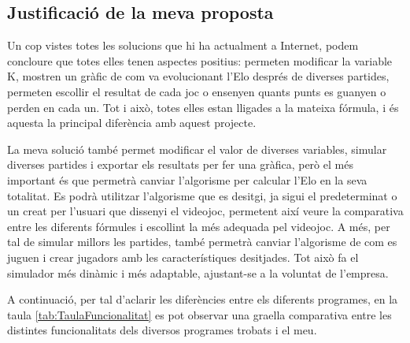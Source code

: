\documentclass[a4paper]{article}
\begin{document}
\subsection{Justificació de la meva proposta}
Un cop vistes totes les solucions que hi ha actualment a Internet, podem concloure que totes elles tenen aspectes positius: permeten modificar la variable K,  mostren un gràfic de com va evolucionant l'Elo després de diverses partides,  permeten escollir el resultat de cada joc o ensenyen quants punts es guanyen o perden en cada un. Tot i això, totes elles estan lligades a la mateixa fórmula, i és aquesta la principal diferència amb aquest projecte.

La meva solució també permet modificar el valor de diverses variables, simular diverses partides i exportar els resultats per fer una gràfica, però el més important és que permetrà canviar l'algorisme per calcular l'Elo en la seva totalitat. Es podrà utilitzar l'algorisme que es desitgi, ja sigui el predeterminat o un creat per l'usuari que dissenyi el videojoc, permetent així veure la comparativa entre les diferents fórmules i escollint la més adequada pel videojoc. A més, per tal de simular millors les partides, també permetrà canviar l'algorisme de com es juguen i crear jugadors amb les característiques desitjades. Tot això fa el simulador més dinàmic i més adaptable, ajustant-se a la voluntat de l'empresa.

A continuació, per tal d'aclarir les diferències entre els diferents programes, en la taula \ref{tab:TaulaFuncionalitat} es pot observar una graella comparativa entre les distintes funcionalitats dels diversos programes trobats i el meu.
\end{document}
